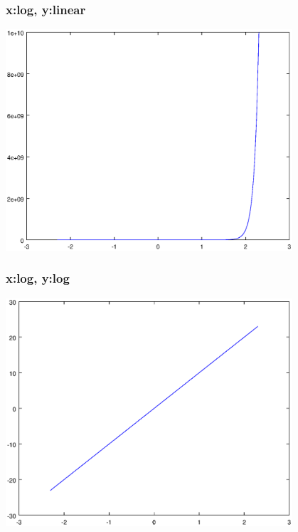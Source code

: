 \documentclass[12pt,a4paper]{article}
\begin{document}
\subsubsection{x:log, y:linear} 
\includegraphics[width=0.8\textwidth]{3.eps}
\subsubsection{x:log, y:log} 
\includegraphics[width=0.8\textwidth]{4.eps}
\end{document}
